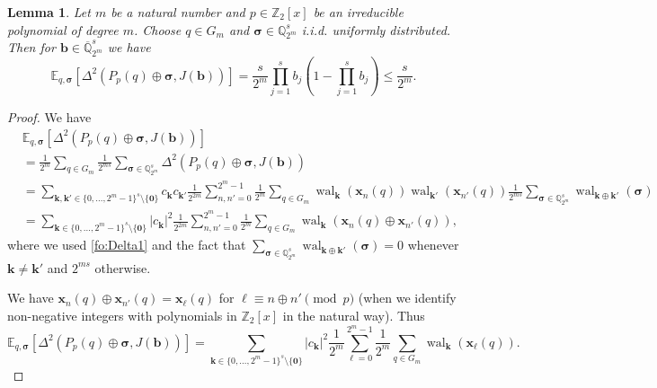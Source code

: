 \documentclass[12pt]{article}
\newtheorem{lemma}[theorem]{Lemma}
\theoremstyle{definition}
\numberwithin{equation}{section}
\begin{document}
\begin{lemma}\label{lem_EDelta}
Let $m$ be a natural number and $p \in \mathbb{Z}_2[x]$ be an irreducible polynomial of degree $m$. Choose $q \in G_m$ and $\bm{\sigma} \in \mathbb{Q}_{2^m}^s$ i.i.d. uniformly distributed. Then for  $\bm{b} \in  \overline{\mathbb{Q}}_{2^m}^s$ we have
\begin{equation*}
\mathbb{E}_{q, \bm{\sigma}} [\Delta^2(P_p(q) \oplus \bm{\sigma}, J(\bm{b}))] = \frac{s}{2^m} \prod_{j=1}^s b_j \left( 1 - \prod_{j=1}^s b_j \right) \le \frac{s}{2^m}.
\end{equation*}
\end{lemma}

\begin{proof}
We have
\begin{align*}
& \mathbb{E}_{q, \bm{\sigma}}[ \Delta^2(P_p(q) \oplus \bm{\sigma}, J(\bm{b}))] \\ 
& = \frac{1}{2^{m}}  \sum_{q \in G_m} \frac{1}{2^{ms}} \sum_{\bm{\sigma} \in \mathbb{Q}_{2^m}^s} \Delta^2(P_p(q) \oplus \bm{\sigma},J(\bm{b})) \\ 
& =  \sum_{\bm{k}, \bm{k}' \in \{0, \ldots, 2^{m}-1\}^s \setminus \{\bm{0}\}}  c_{\bm{k}} c_{\bm{k}'} \frac{1}{2^{2m}} \sum_{n, n' =0}^{2^m-1} \frac{1}{2^{m}} \sum_{q \in G_m}  \operatorname{wal}_{\bm{k}}(\bm{x}_n(q)) \operatorname{wal}_{\bm{k}'}(\bm{x}_{n'}(q)) \frac{1}{2^{ms}} \sum_{\bm{\sigma} \in \mathbb{Q}_{2^m}^s} \operatorname{wal}_{\bm{k} \oplus \bm{k}'}(\bm{\sigma}) \\ 
& =  \sum_{\bm{k} \in \{0, \ldots, 2^{m}-1\}^s \setminus \{\bm{0}\}}  | c_{\bm{k}} |^2  \frac{1}{2^{2m}} 
\sum_{n, n'=0}^{2^m-1} \frac{1}{2^{m}} \sum_{q \in G_m} \operatorname{wal}_{\bm{k}}(\bm{x}_n(q) \oplus \bm{x}_{n'}(q)),
\end{align*}
where we used \eqref{fo:Delta1} and the fact that $\sum_{\bm{\sigma} \in \mathbb{Q}_{2^m}^s} \operatorname{wal}_{\bm{k} \oplus \bm{k}'}(\bm{\sigma})=0$ whenever $\bm{k} \not=\bm{k}'$ and $2^{ms}$ otherwise. 

We have $\bm{x}_n(q) \oplus \bm{x}_{n'}(q) = \bm{x}_{\ell}(q)$ for $\ell \equiv n \oplus n' \pmod{p}$ (when we identify non-negative integers with polynomials in $\mathbb{Z}_2[x]$ in the natural way). Thus
\begin{equation*}%
\mathbb{E}_{q, \bm{\sigma}}[\Delta^2(P_p(q) \oplus \bm{\sigma}, J(\bm{b}))] =  \sum_{\bm{k} \in \{0, \ldots, 2^{m}-1\}^s \setminus \{\bm{0}\}}  | c_{\bm{k}} |^2  \frac{1}{2^{m}} 
\sum_{\ell =0}^{2^m-1} \frac{1}{2^{m}} \sum_{q \in G_m} \operatorname{wal}_{\bm{k}}(\bm{x}_\ell(q)).
\end{equation*}


\end{proof}
\end{document}
